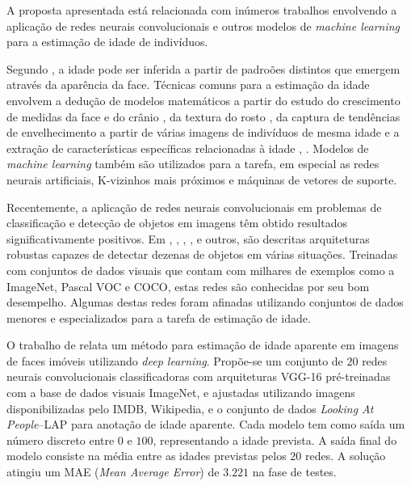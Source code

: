 A proposta apresentada está relacionada com inúmeros trabalhos envolvendo a aplicação de redes neurais convolucionais e outros modelos de \emph{machine learning} para a estimação de idade de indivíduos.

Segundo \cite{fu2010age}, a idade pode ser inferida a partir de padroões distintos que emergem através da aparência da face. Técnicas comuns para a estimação da idade envolvem a dedução de modelos matemáticos a partir do estudo do crescimento de medidas da face e do crânio \cite{kwon1999age}, da textura do rosto \cite{lanitis2002toward}, da captura de tendências de envelhecimento a partir de várias imagens de indivíduos de mesma idade \cite{fu2007estimating} e a extração de características específicas relacionadas à idade \cite{suo2008design}, \cite{lou2018expression}. Modelos de \emph{machine learning} também são utilizados para a tarefa, em especial as redes neurais artificiais, K-vizinhos mais próximos e máquinas de vetores de suporte.

Recentemente, a aplicação de redes neurais convolucionais em problemas de classificação e detecção de objetos em imagens têm obtido resultados significativamente positivos. Em \cite{vggnet}, \cite{resnet}, \cite{inception}, \cite{redmon2016you}, \cite{ssd} e outros, são descritas arquiteturas robustas capazes de detectar dezenas de objetos em várias situações. Treinadas com conjuntos de dados visuais que contam com milhares de exemplos como a ImageNet, Pascal VOC e COCO, estas redes são conhecidas por seu bom desempelho. Algumas destas redes foram afinadas utilizando conjuntos de dados menores e especializados para a tarefa de estimação de idade.

O trabalho de \cite{rothe2015dex} relata um método para estimação de idade aparente em imagens de faces imóveis utilizando \emph{deep learning}. Propõe-se um conjunto de $20$ redes neurais convolucionais classificadoras com arquiteturas VGG-16 pré-treinadas com a base de dados visuais ImageNet, e ajustadas utilizando imagens disponibilizadas pelo IMDB, Wikipedia, e o conjunto de dados \emph{Looking At People}--LAP para anotação de idade aparente. Cada modelo tem como saída um número discreto entre $0$ e $100$, representando a idade prevista. A saída final do modelo consiste na média entre as idades previstas pelos $20$ redes. A solução atingiu um MAE (\emph{Mean Average Error}) de $3.221$ na fase de testes.

